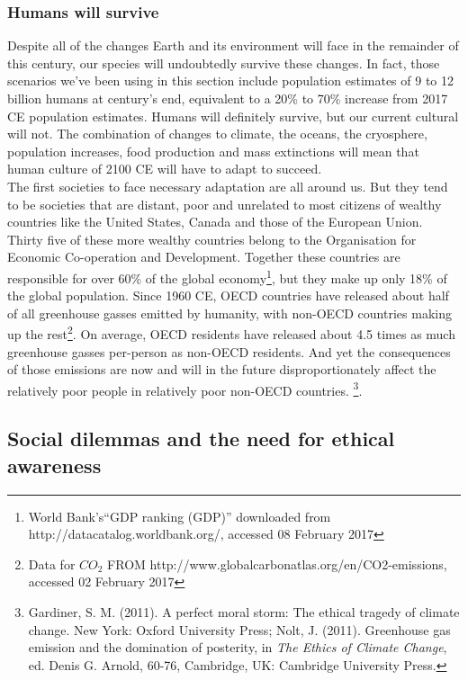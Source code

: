 \documentclass[amstex,12pt]{book}
\begin{document}
\subsubsection{Humans will survive}
Despite all of the changes Earth and its environment will face in the remainder of this century, our species will undoubtedly survive these changes. In fact, those scenarios we've been using in this section include population estimates of 9 to 12 billion humans at century's end, equivalent to a 20\% to 70\% increase from 2017 CE population estimates. Humans will definitely survive, but our current cultural will not. The combination of changes to climate, the oceans, the cryosphere, population increases, food production and mass extinctions will mean that human culture of 2100 CE will have to adapt to succeed.\\

The first societies to face necessary adaptation are all around us. But they tend to be societies that are distant, poor and unrelated to most citizens of wealthy countries like the United States, Canada and those of the European Union. Thirty five of these more wealthy countries belong to the Organisation for Economic Co-operation and Development. Together these countries are responsible for over 60\% of the global economy\footnote{World Bank's``GDP ranking (GDP)'' downloaded from http://datacatalog.worldbank.org/, accessed 08 February 2017}, but they make up only 18\% of the global population. Since 1960 CE, OECD countries have released about half of all greenhouse gasses emitted by humanity, with non-OECD countries making up the rest\footnote{Data for $CO_2$ FROM http://www.globalcarbonatlas.org/en/CO2-emissions, accessed 02 February 2017}. On average, OECD residents have released about 4.5 times as much greenhouse gasses per-person as non-OECD residents. And yet the consequences of those emissions are now and will in the future disproportionately affect the relatively poor people in relatively poor non-OECD countries. \footnote{Gardiner, S. M. (2011). A perfect moral storm: The ethical tragedy of climate change. New York: Oxford University Press; Nolt, J. (2011). Greenhouse gas emission and the domination of posterity, in \textit{The Ethics of Climate Change}, ed. Denis G. Arnold, 60-76, Cambridge, UK: Cambridge University Press.}. \\

\subsection{Social dilemmas and the need for ethical awareness}
\end{document}
